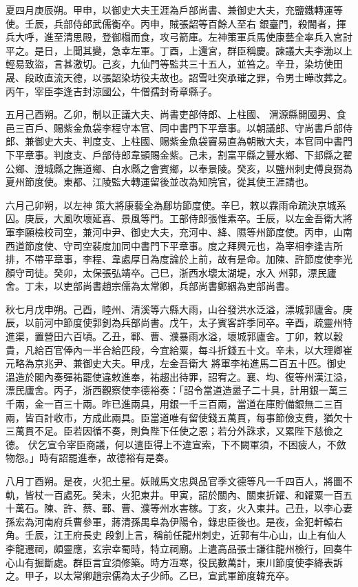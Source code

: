 \begin{pinyinscope}
 夏四月庚辰朔。甲申，以御史大夫王涯為戶部尚書、兼御史大夫，充鹽鐵轉運等使。壬辰，兵部侍郎武儒衡卒。丙申，賊張韶等百餘人至右
 銀臺門，殺閽者，揮兵大呼，進至清思殿，登御榻而食，攻弓箭庫。左神策軍兵馬使康藝全率兵入宮討平之。是日，上聞其變，急幸左軍。丁酉，上還宮，群臣稱慶。諫議大夫李渤以上輕易致盜，言甚激切。己亥，九仙門等監共三十五人，並笞之。辛丑，染坊使田晟、段政直流天德，以張韶染坊役夫故也。詔雪吐突承璀之罪，令男士曄改葬之。丙午，宰臣李逢吉封涼國公，牛僧孺封奇章縣子。



 五月己酉朔。乙卯，制以正議大夫、尚書吏部侍郎、上柱國、
 渭源縣開國男、食邑三百戶、賜紫金魚袋李程守本官、同中書門下平章事。以朝議郎、守尚書戶部侍郎、兼御史大夫、判度支、上柱國、賜紫金魚袋竇易直為朝散大夫，本官同中書門下平章事。判度支、戶部侍郎韋顗賜金紫。己未，割富平縣之豐水鄉、下邽縣之翟公鄉、澄城縣之撫道鄉、白水縣之會賓鄉，以奉景陵。癸亥，以鹽州刺史傅良弼為夏州節度使。東都、江陵監大轉運留後並改為知院官，從其使王涯請也。



 六月己卯朔，以左神
 策大將康藝全為鄜坊節度使。辛巳，敕以霖雨命疏決京城系囚。庚辰，大風吹壞延喜、景風等門。工部侍郎張惟素卒。壬辰，以左金吾衛大將軍李願檢校司空，兼河中尹、御史大夫，充河中、絳、隰等州節度使。丙申，山南西道節度使、守司空裴度加同中書門下平章事。度之拜興元也，為宰相李逢吉所排，不帶平章事，李程、韋處厚日為度論於上前，故有是命。加陳、許節度使李光顏守司徒。癸卯，太保張弘靖卒。己巳，浙西水壞太湖堤，水入
 州郭，漂民廬舍。丁未，以吏部尚書趙宗儒為太常卿，兵部尚書鄭絪為吏部尚書。



 秋七月戊申朔。己酉，睦州、清溪等六縣大雨，山谷發洪水泛溢，漂城郭廬舍。庚辰，以前河中節度使郭釗為兵部尚書。戊午，太子賓客許季同卒。辛酉，疏靈州特進渠，置營田六百頃。乙丑，鄆、曹、濮暴雨水溢，壞城郭廬舍。丁卯，敕以穀貴，凡給百官俸內一半合給匹段，今宜給粟，每斗折錢五十文。辛未，以大理卿崔元略為京兆尹、兼御史大夫。甲戌，左金吾衛大
 將軍李祐進馬二百五十匹。御史溫造於閣內奏彈祐罷使違敕進奉，祐趨出待罪，詔宥之。襄、均、復等州漢江溢，漂民廬舍。丙子，浙西觀察使李德裕奏：「詔令當道造盝子二十具，計用銀一萬三千兩，金一百三十兩。昨已進兩具，用銀一千三百兩，當道在庫貯備銀無二三百兩，皆百計收市，方成此兩具。臣當道唯有留使錢五萬貫，每事節儉支費，猶欠十三萬貫不足。臣若因循不奏，則負陛下任使之恩；若分外誅求，又累陛下慈儉之德。
 伏乞宣令宰臣商議，何以遣臣得上不違宣索，下不闕軍須，不困疲人，不斂物怨。」時有詔罷進奉，故德裕有是奏。



 八月丁酉朔。是夜，火犯土星。妖賊馬文忠與品官季文德等凡一千四百人，將圖不軌，皆杖一百處死。癸未，火犯東井。甲寅，詔於關內、關東折糴、和糴粟一百五十萬石。陳、許、蔡、鄆、曹、濮等州水害稼。丁亥，火入東井。己丑，以李心妻孫宏為河南府兵曹參軍，蔣清孫禺阜為伊陽令，錄忠臣後也。是夜，金犯軒轅右角。壬辰，江王府長史
 段釗上言，稱前任龍州刺史，近郭有牛心山，山上有仙人李龍遷祠，頗靈應，玄宗幸蜀時，特立祠廟。上遣高品張士謙往龍州檢行，回奏牛心山有掘斷處。群臣言宜須修築。時方冱寒，役民數萬計，東川節度使李絳表訴之。甲子，以太常卿趙宗儒為太子少師。乙巳，宣武軍節度韓充卒。




\end{pinyinscope}
